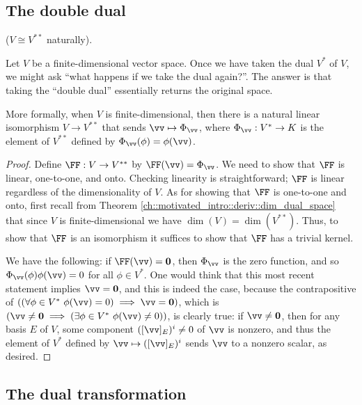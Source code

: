 \subsection*{The double dual}

\begin{theorem}
\label{ch::motivated_intro::thm::V_iso_double_dual}
    ($V \cong V^{**}$ naturally). 
    
    Let $V$ be a finite-dimensional vector space. Once we have taken the dual $V^*$ of $V$, we might ask ``what happens if we take the dual again?''. The answer is that taking the ``double dual'' essentially returns the original space.
    
    More formally, when $V$ is finite-dimensional, then there is a natural linear isomorphism $V \rightarrow V^{**}$ that sends $\vv \mapsto \Phi_\vv$, where $\Phi_\vv:V^* \rightarrow K$ is the element of $V^{**}$ defined by $\Phi_\vv(\phi) = \phi(\vv)$.
\end{theorem}

\begin{proof}
    Define $\FF:V \rightarrow V^{**}$ by $\FF(\vv) = \Phi_\vv$. We need to show that $\FF$ is linear, one-to-one, and onto. Checking linearity is straightforward; $\FF$ is linear regardless of the dimensionality of $V$. As for showing that $\FF$ is one-to-one and onto, first recall from Theorem \ref{ch::motivated_intro::deriv::dim_dual_space} that since $V$ is finite-dimensional we have $\dim(V) = \dim(V^{**})$. Thus, to show that $\FF$ is an isomorphism it suffices to show that $\FF$ has a trivial kernel.
    
    We have the following: if $\FF(\vv) = \mathbf{0}$, then $\Phi_\vv$ is the zero function, and so $\Phi_\vv(\phi) \phi(\vv) = 0$ for all $\phi \in V^*$. One would think that this most recent statement implies $\vv = \mathbf{0}$, and this is indeed the case, because the contrapositive of $((\forall \phi \in V^* \spc \phi(\vv) = 0) \implies \vv = \mathbf{0})$, which is $(\vv \neq \mathbf{0} \implies (\exists \phi \in V^* \spc \phi(\vv) \neq 0))$, is clearly true: if $\vv \neq \mathbf{0}$, then for any basis $E$ of $V$, some component $([\vv]_E)^i \neq 0$ of $\vv$ is nonzero, and thus the element of $V^*$ defined by $\vv \mapsto ([\vv]_E)^i$ sends $\vv$ to a nonzero scalar, as desired.
\end{proof}

\subsection*{The dual transformation}

